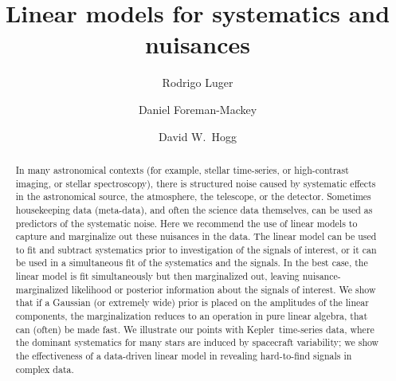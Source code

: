 \documentclass[modern]{rnaastex}
\newcommand{\project}[1]{\textsf{#1}}
\newcommand{\kepler}{\project{Kepler}}
\begin{document}
\title{%
    Linear models for systematics and nuisances
}

\author[0000-0002-0296-3826]{Rodrigo Luger}

\author[0000-0002-9328-5652]{Daniel Foreman-Mackey}

\author[0000-0003-2866-9403]{David W.\ Hogg}

\begin{abstract}
In many astronomical contexts (for example, stellar time-series, or
high-contrast imaging, or stellar spectroscopy), there is structured
noise caused by systematic
effects in the astronomical source, the atmosphere, the telescope, or
the detector.
Sometimes housekeeping data (meta-data), and often the science data themselves,
can be used as predictors of the systematic noise.
Here we recommend the use of linear models to capture and marginalize
out these nuisances in the data.
The linear model can be used to fit and subtract systematics prior to
investigation of the signals of interest, or it
can be used in a simultaneous fit of the systematics and the signals.
In the best case, the linear model is fit simultaneously but then marginalized
out, leaving nuisance-marginalized likelihood or posterior information
about the signals of interest.
We show that if a Gaussian (or extremely wide) prior is placed on the
amplitudes of the linear components, the marginalization reduces to an
operation in pure linear algebra, that can (often) be made fast.
We illustrate our points with \kepler\ time-series data, where the dominant
systematics for many stars are induced by spacecraft variability;
we show the effectiveness of a data-driven linear model in revealing
hard-to-find signals in complex data.
\end{abstract}

\end{document}
